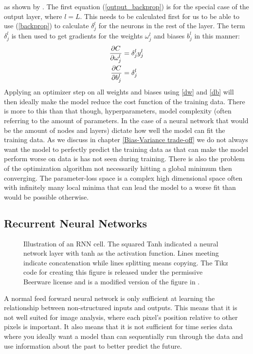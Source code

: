 as shown by \citet{fysstkweek40}.
The first equation (\ref{output_backprop}) is for the special case of the output 
layer, where $l=L$. This needs to be calculated first for us to be able to use 
(\ref{backprop}) to calculate $\delta^l_j$ for the neurons in the rest of the layer. 
The term $\delta^l_j$ is then used to get gradients for the weights $\omega^l_j$ 
and biases $b^l_j$ in this manner:
\begin{align}
    \pdv{C}{\omega^l_j} &= \delta^l_j y^l_j \label{dw}\\
    \pdv{C}{b^l_j} &= \delta^l_j \label{db}
\end{align}
Applying an optimizer step on all weights and biases using \ref{dw} and \ref{db}
will then ideally make the model reduce the cost function of the training data.
There is more to this than that though, hyperparameters, model complexity (often 
referring to the amount of parameters. In the case of a neural network that would 
be the amount of nodes and layers) dictate how well the model can fit the training 
data. As we discuss in chapter \ref{Bias-Variance trade-off} we do not always want 
the model to perfectly predict the training data as that can make the model perform 
worse on data is has not seen during training. There is also the problem of the 
optimization algorithm not necessarily hitting a global minimum then converging. 
The parameter-loss space is a complex high dimensional space often with infinitely 
many local minima that can lead the model to a worse fit than would be possible 
otherwise. \citationneeded
\subsection{Recurrent Neural Networks}
\label{RNN Theory}
\begin{figure}
    
    \caption[An RNN cell.]{Illustration of an RNN cell. The squared Tanh indicated a neural 
    network layer with tanh as the activation function. Lines meeting indicate 
    concatenation while lines splitting means copying. 
The Tikz code for creating this figure is released under the permissive Beerware license 
    and is a modified version of the figure in \citet{tikzlstm}.}
	\label{RNN figure}
\end{figure}
A normal feed forward neural network is only sufficient at learning the relationship 
between non-structured inputs and outputs. This means that it is not well suited 
for image analysis, where each pixel's position relative to other pixels is important. 
It also means that it is not sufficient for time series data where you ideally 
want a model than can sequentially run through the data and use information about 
the past to better predict the future.

